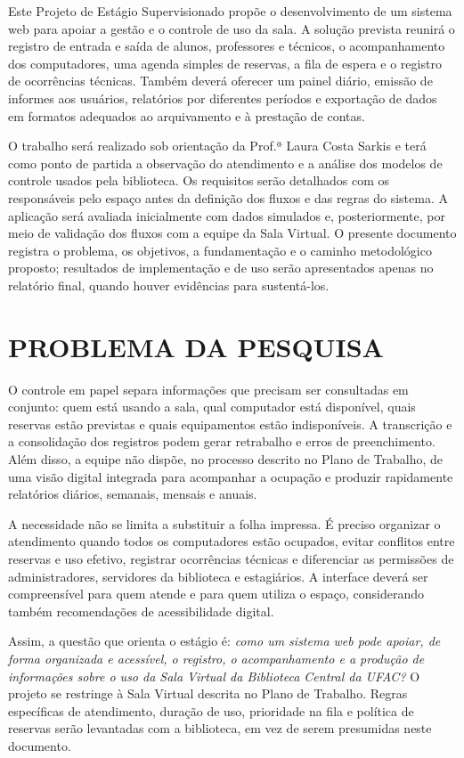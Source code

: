 \documentclass[12pt,a4paper]{article}
\newcommand{\secao}[1]{\clearpage\section{#1}}
\begin{document}
Este Projeto de Estágio Supervisionado propõe o desenvolvimento de um sistema web para apoiar a gestão e o controle de uso da sala. A solução prevista reunirá o registro de entrada e saída de alunos, professores e técnicos, o acompanhamento dos computadores, uma agenda simples de reservas, a fila de espera e o registro de ocorrências técnicas. Também deverá oferecer um painel diário, emissão de informes aos usuários, relatórios por diferentes períodos e exportação de dados em formatos adequados ao arquivamento e à prestação de contas.

O trabalho será realizado sob orientação da Prof.ª Laura Costa Sarkis e terá como ponto de partida a observação do atendimento e a análise dos modelos de controle usados pela biblioteca. Os requisitos serão detalhados com os responsáveis pelo espaço antes da definição dos fluxos e das regras do sistema. A aplicação será avaliada inicialmente com dados simulados e, posteriormente, por meio de validação dos fluxos com a equipe da Sala Virtual. O presente documento registra o problema, os objetivos, a fundamentação e o caminho metodológico proposto; resultados de implementação e de uso serão apresentados apenas no relatório final, quando houver evidências para sustentá-los.

\secao{PROBLEMA DA PESQUISA}

O controle em papel separa informações que precisam ser consultadas em conjunto: quem está usando a sala, qual computador está disponível, quais reservas estão previstas e quais equipamentos estão indisponíveis. A transcrição e a consolidação dos registros podem gerar retrabalho e erros de preenchimento. Além disso, a equipe não dispõe, no processo descrito no Plano de Trabalho, de uma visão digital integrada para acompanhar a ocupação e produzir rapidamente relatórios diários, semanais, mensais e anuais.

A necessidade não se limita a substituir a folha impressa. É preciso organizar o atendimento quando todos os computadores estão ocupados, evitar conflitos entre reservas e uso efetivo, registrar ocorrências técnicas e diferenciar as permissões de administradores, servidores da biblioteca e estagiários. A interface deverá ser compreensível para quem atende e para quem utiliza o espaço, considerando também recomendações de acessibilidade digital.

Assim, a questão que orienta o estágio é: \textit{como um sistema web pode apoiar, de forma organizada e acessível, o registro, o acompanhamento e a produção de informações sobre o uso da Sala Virtual da Biblioteca Central da UFAC?} O projeto se restringe à Sala Virtual descrita no Plano de Trabalho. Regras específicas de atendimento, duração de uso, prioridade na fila e política de reservas serão levantadas com a biblioteca, em vez de serem presumidas neste documento.
\end{document}
